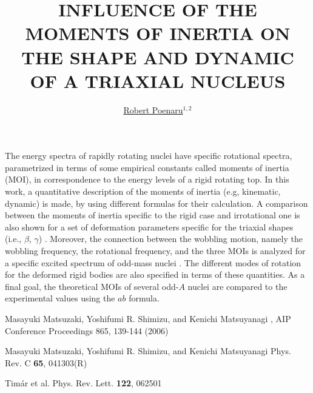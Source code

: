 ﻿\documentclass[a4paper,10pt,english]{article}
\begin{document}
\title{INFLUENCE OF THE MOMENTS OF INERTIA ON THE SHAPE AND DYNAMIC OF A TRIAXIAL NUCLEUS}


\author{\uline{Robert Poenaru}$^{1,2}$}

\maketitle

\address{$^{1}$Doctoral School of Physics, University of Bucharest, Bucharest, Romania}

\address{$^{2}$Department of Theoretical Physics, NIPNE-HH, Magurele, Romania}


The energy spectra of rapidly rotating nuclei have specific rotational spectra, parametrized in terms of some empirical constants called moments of inertia (MOI), in correspondence to the energy levels of a rigid rotating top. In this work, a quantitative description of the moments of inertia (e.g, kinematic, dynamic) is made, by using different formulas for their calculation. A comparison between the moments of inertia specific to the rigid case and irrotational one is also shown for a set of deformation parameters specific for the triaxial shapes (i.e., $\beta$, $\gamma$) \cite{key-0}. Moreover, the connection between the wobbling motion, namely the wobbling frequency, the rotational frequency, and the three MOIs is analyzed for a specific excited spectrum of odd-mass nuclei \cite{key-1}. The different modes of rotation for the deformed rigid bodies are also specified in terms of these quantities. As a final goal, the theoretical MOIs of several odd-$A$ nuclei are compared to the experimental values using the $ab$ formula\cite{key-2}.

\begin{thebibliography}{References}
 Masayuki Matsuzaki, Yoshifumi R. Shimizu, and Kenichi Matsuyanagi , AIP Conference Proceedings 865, 139-144 (2006)

 Masayuki Matsuzaki, Yoshifumi R. Shimizu, and Kenichi Matsuyanagi Phys. Rev. C \textbf{65}, 041303(R)
    
 Timár et al. Phys. Rev. Lett. \textbf{122}, 062501

\end{thebibliography}
\end{document}
